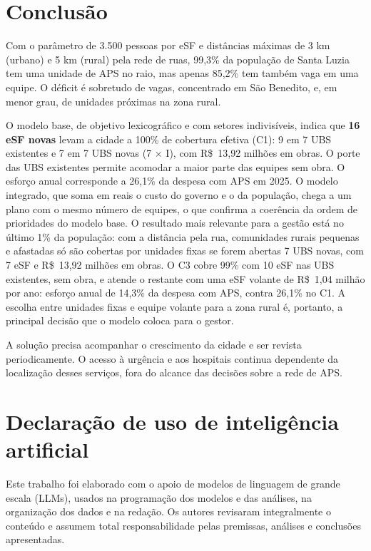 \documentclass[11pt,a4paper]{article}
\begin{document}
\section{Conclusão}

Com o parâmetro de 3.500 pessoas por eSF e distâncias máximas de 3 km (urbano) e 5 km (rural) pela rede de ruas, 99,3\% da população de Santa Luzia tem uma unidade de APS no raio, mas apenas 85,2\% tem também vaga em uma equipe. O déficit é sobretudo de vagas, concentrado em São Benedito, e, em menor grau, de unidades próximas na zona rural.

O modelo base, de objetivo lexicográfico e com setores indivisíveis, indica que \textbf{16 eSF novas} levam a cidade a 100\% de cobertura efetiva (C1): 9 em 7 UBS existentes e 7 em 7 UBS novas (7 × I), com R\$~13,92 milhões em obras. O porte das UBS existentes permite acomodar a maior parte das equipes sem obra. O esforço anual corresponde a 26,1\% da despesa com APS em 2025. O modelo integrado, que soma em reais o custo do governo e o da população, chega a um plano com o mesmo número de equipes, o que confirma a coerência da ordem de prioridades do modelo base. O resultado mais relevante para a gestão está no último 1\% da população: com a distância pela rua, comunidades rurais pequenas e afastadas só são cobertas por unidades fixas se forem abertas 7 UBS novas, com 7 eSF e R\$~13,92 milhões em obras. O C3 cobre 99\% com 10 eSF nas UBS existentes, sem obra, e atende o restante com uma eSF volante de R\$~1,04 milhão por ano: esforço anual de 14,3\% da despesa com APS, contra 26,1\% no C1. A escolha entre unidades fixas e equipe volante para a zona rural é, portanto, a principal decisão que o modelo coloca para o gestor.

A solução precisa acompanhar o crescimento da cidade e ser revista periodicamente. O acesso à urgência e aos hospitais continua dependente da localização desses serviços, fora do alcance das decisões sobre a rede de APS.


\section*{Declaração de uso de inteligência artificial}

Este trabalho foi elaborado com o apoio de modelos de linguagem de grande escala (LLMs), usados na programação dos modelos e das análises, na organização dos dados e na redação. Os autores revisaram integralmente o conteúdo e assumem total responsabilidade pelas premissas, análises e conclusões apresentadas.
\end{document}
